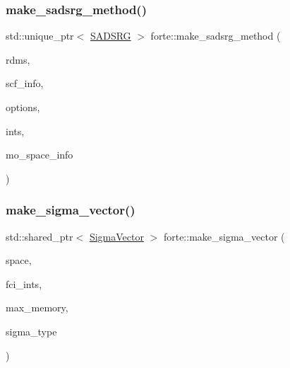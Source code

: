 \subsubsection{\texorpdfstring{make\+\_\+sadsrg\+\_\+method()}{make\_sadsrg\_method()}}
{\footnotesize\ttfamily std\+::unique\+\_\+ptr$<$ \mbox{\hyperlink{classforte_1_1_s_a_d_s_r_g}{S\+A\+D\+S\+RG}} $>$ forte\+::make\+\_\+sadsrg\+\_\+method (\begin{DoxyParamCaption}\item[{\mbox{\hyperlink{classforte_1_1_r_d_ms}{R\+D\+Ms}}}]{rdms,  }\item[{std\+::shared\+\_\+ptr$<$ \mbox{\hyperlink{classforte_1_1_s_c_f_info}{S\+C\+F\+Info}} $>$}]{scf\+\_\+info,  }\item[{std\+::shared\+\_\+ptr$<$ \mbox{\hyperlink{classforte_1_1_forte_options}{Forte\+Options}} $>$}]{options,  }\item[{std\+::shared\+\_\+ptr$<$ \mbox{\hyperlink{classforte_1_1_forte_integrals}{Forte\+Integrals}} $>$}]{ints,  }\item[{std\+::shared\+\_\+ptr$<$ \mbox{\hyperlink{classforte_1_1_m_o_space_info}{M\+O\+Space\+Info}} $>$}]{mo\+\_\+space\+\_\+info }\end{DoxyParamCaption})}

\mbox{\label{namespaceforte_a99d30e58aa598d6d0b8e39e9ddc0cb53}} 
\subsubsection{\texorpdfstring{make\+\_\+sigma\+\_\+vector()}{make\_sigma\_vector()}\hspace{0.1cm}{\footnotesize\ttfamily [1/2]}}
{\footnotesize\ttfamily std\+::shared\+\_\+ptr$<$ \mbox{\hyperlink{classforte_1_1_sigma_vector}{Sigma\+Vector}} $>$ forte\+::make\+\_\+sigma\+\_\+vector (\begin{DoxyParamCaption}\item[{\mbox{\hyperlink{classforte_1_1_determinant_hash_vec}{Determinant\+Hash\+Vec}} \&}]{space,  }\item[{std\+::shared\+\_\+ptr$<$ \mbox{\hyperlink{classforte_1_1_active_space_integrals}{Active\+Space\+Integrals}} $>$}]{fci\+\_\+ints,  }\item[{size\+\_\+t}]{max\+\_\+memory,  }\item[{\mbox{\hyperlink{namespaceforte_a94410e08f0cf9a0cfc5e53c70b6bf485}{Sigma\+Vector\+Type}}}]{sigma\+\_\+type }\end{DoxyParamCaption})}

